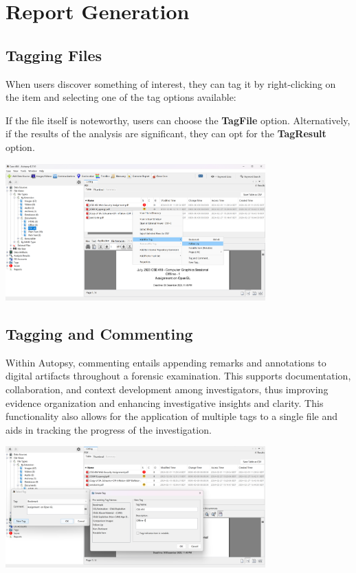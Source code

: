 \documentclass{extarticle}
\begin{document}
\section{Report Generation}
\subsection{Tagging Files}

When users discover something of interest, they can tag it by right-clicking on the item and selecting one of the tag options available:

If the file itself is noteworthy, users can choose the \textbf{TagFile} option. Alternatively, if the results of the analysis are significant, they can opt for the \textbf{TagResult} option.

\begin{center}
    \includegraphics[width=0.75\textwidth]{5/5.1/Tagging.png}
\end{center}

\subsection{Tagging and Commenting}

Within Autopsy, commenting entails appending remarks and annotations to digital artifacts throughout a forensic examination. This supports documentation, collaboration, and context development among investigators, thus improving evidence organization and enhancing investigative insights and clarity. This functionality also allows for the application of multiple tags to a single file and aids in tracking the progress of the investigation.

\begin{center}
    \includegraphics[width=0.75\textwidth]{5/5.2/Tagging & Commenting.png}
\end{center}
\end{document}
